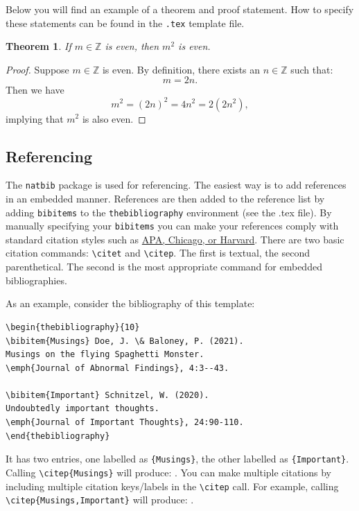 \documentclass{amsart}
\theoremstyle{plain}
\newtheorem{theorem}{Theorem}%
\begin{document}
Below you will find an example of a theorem and proof statement.
How to specify these statements can be found in the \texttt{.tex} template file.

\begin{theorem}\label{ExampleTheorem}
If $m \in \mathbb{Z}$ is even, then $m^2$ is even.
\end{theorem}

\begin{proof}
Suppose $m \in \mathbb{Z}$ is even.
By definition, there exists an $n \in \mathbb{Z}$ such that:
\begin{equation*}
m = 2n.
\end{equation*}
Then we have
\begin{equation*}
m^2 = (2n)^2 = 4n^2 = 2(2n^2),
\end{equation*}
implying that $m^2$ is also even.
\end{proof}


\subsection{Referencing}\label{REFS}
The \texttt{natbib} package is used for referencing.
The easiest way is to add references in an embedded manner.
References are then added to the reference list by adding \verb|bibitems| to the \verb|thebibliography| environment (see the .tex file).
By manually specifying your \verb|bibitems| you can make your references comply with standard citation styles such as \href{https://en.wikipedia.org/wiki/Citation}{APA, Chicago, or Harvard}.
There are two basic citation commands: \verb|\citet| and \verb|\citep|.
The first is textual, the second parenthetical.
The second is the most appropriate command for embedded bibliographies.

As an example, consider the bibliography of this template:
\begin{verbatim}
\begin{thebibliography}{10}
\bibitem{Musings} Doe, J. \& Baloney, P. (2021).
Musings on the flying Spaghetti Monster.
\emph{Journal of Abnormal Findings}, 4:3--43.

\bibitem{Important} Schnitzel, W. (2020).
Undoubtedly important thoughts.
\emph{Journal of Important Thoughts}, 24:90-110.
\end{thebibliography}
\end{verbatim}
It has two entries, one labelled as \verb|{Musings}|, the other labelled as \verb|{Important}|.
Calling \verb|\citep{Musings}| will produce: \citep{Musings}.
You can make multiple citations by including multiple citation keys/labels in the \verb|\citep| call.
For example, calling \verb|\citep{Musings,Important}| will produce: \citep{Musings,Important}.
\end{document}
